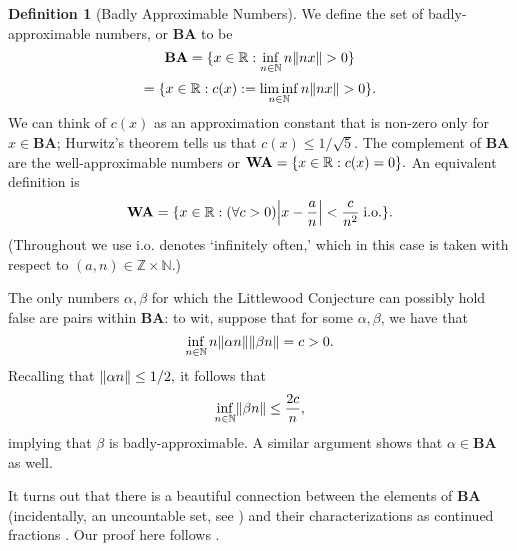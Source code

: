 \documentclass[12pt, letterpaper, oneside]{book}
\newcommand{\ga}{\ensuremath{\alpha}}
\newcommand{\gb}{\ensuremath{\beta}}
\newcommand{\R}{\mathbb{R}}
\newcommand{\N}{\mathbb{N}}
\newcommand{\Z}{\mathbb{Z}}
\DeclarePairedDelimiter{\abs}{\lvert}{\rvert}
\DeclarePairedDelimiter{\norm}{\lVert}{\rVert}
\DeclarePairedDelimiter{\set}{\lbrace}{\rbrace}
\theoremstyle{plain}
\theoremstyle{definition}
\newtheorem{definition}{Definition}
\theoremstyle{remark}
\begin{document}
\begin{definition}[Badly Approximable Numbers]
We define the set of badly-approximable numbers, or $\mathbf{BA}$  to be
\[
\mathbf{BA} = \set{x \in \R : \inf_{n\in \N}n\norm{nx} > 0}  
\]
\[
= \set{x \in \R : c(x) := \liminf_{n\in \N}n\norm{nx} > 0}.
\]
We can think of $c(x)$ as an approximation constant that is non-zero only for $x \in \mathbf{BA}$; Hurwitz's theorem tells us that $c(x) \leq 1/\sqrt{5}.$ The complement of $\mathbf{BA}$  are the well-approximable numbers or $\mathbf{WA} = \set{x\in\R:c(x)=0}.$ An equivalent definition is
\[
\mathbf{WA} = \set{x \in \R : (\forall c > 0) \abs*{x - \frac{a}{n}} < \frac{c}{n^2} \; \mbox{i.o.}}.
\]
(Throughout we use $\mbox{i.o.}$ denotes `infinitely often,' which in this case is taken with respect to $(a,n) \in \Z\times\N$.) 
\end{definition}

The only numbers $\ga,\gb$ for which the Littlewood Conjecture can possibly hold false are pairs within $\mathbf{BA}$: to wit, suppose that for some $\ga, \gb$, we have that 
\[
\inf_{n \in \N} n\norm{\alpha n} \norm{\beta n} = c > 0.
\]
Recalling that $\norm{\ga n} \leq 1/2,$ it follows that
\[
\inf_{n \in \N} \norm{\beta n}  \leq \frac{2c}{n},
\]
implying that $\gb$ is badly-approximable. A similar argument shows that $\ga \in \mathbf{BA}$ as well. 

It turns out that there is a beautiful connection between the elements of $\mathbf{BA}$ (incidentally, an uncountable set, see \cite{GH60}) and their characterizations as continued fractions . Our proof here follows \cite{BRV16}.
\end{document}
